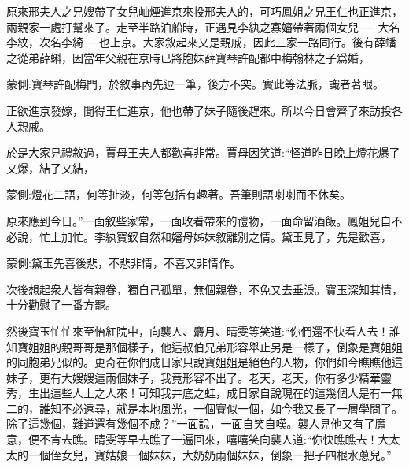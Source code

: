\begin{parag}
    原來邢夫人之兄嫂帶了女兒岫煙進京來投邢夫人的，可巧鳳姐之兄王仁也正進京，兩親家一處打幫來了。走至半路泊船時，正遇見李紈之寡嬸帶著兩個女兒── 大名李紋，次名李綺──也上京。大家敘起來又是親戚，因此三家一路同行。後有薛蟠之從弟薛蝌，因當年父親在京時已將胞妹薛寶琴許配都中梅翰林之子爲婚，\begin{note}蒙側:寶琴許配梅門，於敘事內先逗一筆，後方不突。實此等法脈，識者著眼。\end{note}正欲進京發嫁，聞得王仁進京，他也帶了妹子隨後趕來。所以今日會齊了來訪投各人親戚。
\end{parag}


\begin{parag}
    於是大家見禮敘過，賈母王夫人都歡喜非常。賈母因笑道:“怪道昨日晚上燈花爆了又爆，結了又結，\begin{note}蒙側:燈花二語，何等扯淡，何等包括有趣著。吾筆則語喇喇而不休矣。\end{note}原來應到今日。”一面敘些家常，一面收看帶來的禮物，一面命留酒飯。鳳姐兒自不必說，忙上加忙。李紈寶釵自然和嬸母姊妹敘離別之情。黛玉見了，先是歡喜，\begin{note}蒙側:黛玉先喜後悲，不悲非情，不喜又非情作。\end{note}次後想起衆人皆有親眷，獨自己孤單，無個親眷，不免又去垂淚。寶玉深知其情，十分勸慰了一番方罷。
\end{parag}


\begin{parag}
    然後寶玉忙忙來至怡紅院中，向襲人、麝月、晴雯等笑道:“你們還不快看人去！誰知寶姐姐的親哥哥是那個樣子，他這叔伯兄弟形容舉止另是一樣了，倒象是寶姐姐的同胞弟兄似的。更奇在你們成日家只說寶姐姐是絕色的人物，你們如今瞧瞧他這妹子，更有大嫂嫂這兩個妹子，我竟形容不出了。老天，老天，你有多少精華靈秀，生出這些人上之人來！可知我井底之蛙，成日家自說現在的這幾個人是有一無二的，誰知不必遠尋，就是本地風光，一個賽似一個，如今我又長了一層學問了。除了這幾個，難道還有幾個不成？”一面說，一面自笑自嘆。襲人見他又有了魔意，便不肯去瞧。晴雯等早去瞧了一遍回來，嘻嘻笑向襲人道:“你快瞧瞧去！大太太的一個侄女兒，寶姑娘一個妹妹，大奶奶兩個妹妹，倒象一把子四根水蔥兒。”
\end{parag}


